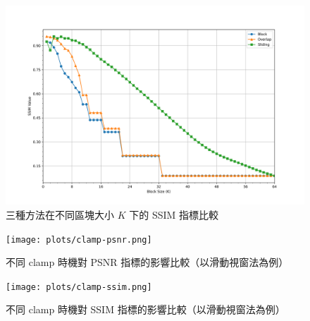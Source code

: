 \documentclass[a4paper,  10pt, oneside, fleqn]{article}
\begin{document}
\begin{figure}[h]
    \centering
    \includegraphics[width=.75\textwidth]{plots/ssim.png}
    \caption{三種方法在不同區塊大小 $K$ 下的 SSIM 指標比較}
    \label{fig:plot-ssim}
\end{figure}

\begin{figure}[h]
    \centering
    \texttt{[image: plots/clamp-psnr.png]}
    \caption{不同 clamp 時機對 PSNR 指標的影響比較（以滑動視窗法為例）}
    \label{fig:compare-clamp-psnr}
\end{figure}

\begin{figure}[h]
    \centering
    \texttt{[image: plots/clamp-ssim.png]}
    \caption{不同 clamp 時機對 SSIM 指標的影響比較（以滑動視窗法為例）}
    \label{fig:compare-clamp-ssim}
\end{figure}
\end{document}
